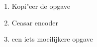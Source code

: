 \begin{enumerate}
  \item Kopi"eer de opgave
  \item Ceasar encoder
  \item een iets moeilijkere opgave
\end{enumerate}